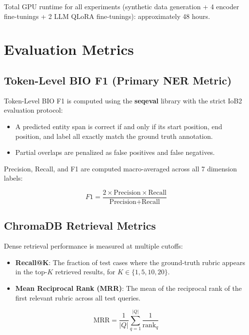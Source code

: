 Total GPU runtime for all experiments (synthetic data generation + 4 encoder fine-tunings + 2 LLM QLoRA fine-tunings): approximately 48 hours.


\section{Evaluation Metrics}

\subsection{Token-Level BIO F1 (Primary NER Metric)}

Token-Level BIO F1 is computed using the \textbf{seqeval} library \cite{seqeval2018} with the strict IoB2 evaluation protocol:
\begin{itemize}
  \item A predicted entity span is correct if and only if its start position, end position, and label all exactly match the ground truth annotation.
  \item Partial overlaps are penalized as false positives and false negatives.
\end{itemize}

Precision, Recall, and F1 are computed macro-averaged across all 7 dimension labels:

\begin{equation}
F1 = \frac{2 \times \text{Precision} \times \text{Recall}}{\text{Precision} + \text{Recall}}
\label{eq:f1}
\end{equation}

\subsection{ChromaDB Retrieval Metrics}

Dense retrieval performance is measured at multiple cutoffs:
\begin{itemize}
  \item \textbf{Recall@K}: The fraction of test cases where the ground-truth rubric appears in the top-$K$ retrieved results, for $K \in \{1, 5, 10, 20\}$.
  \item \textbf{Mean Reciprocal Rank (MRR)}: The mean of the reciprocal rank of the first relevant rubric across all test queries.
\end{itemize}

\begin{equation}
\text{MRR} = \frac{1}{|Q|} \sum_{q=1}^{|Q|} \frac{1}{\text{rank}_q}
\label{eq:mrr}
\end{equation}

